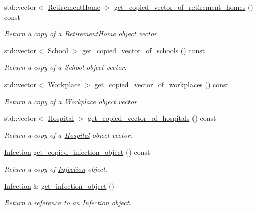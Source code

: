 \begin{DoxyCompactItemize}
std\+::vector$<$ \hyperlink{classRetirementHome}{Retirement\+Home} $>$ \hyperlink{classABM_abe2b2a6cef7427b941f6e5244e6737d4}{get\+\_\+copied\+\_\+vector\+\_\+of\+\_\+retirement\+\_\+homes} () const
\begin{DoxyCompactList}\small\item\em Return a copy of a \hyperlink{classRetirementHome}{Retirement\+Home} object vector. \end{DoxyCompactList}\item 
std\+::vector$<$ \hyperlink{classSchool}{School} $>$ \hyperlink{classABM_aa1c0bb9d97d823fb5c33b5d8ab2615b4}{get\+\_\+copied\+\_\+vector\+\_\+of\+\_\+schools} () const
\begin{DoxyCompactList}\small\item\em Return a copy of a \hyperlink{classSchool}{School} object vector. \end{DoxyCompactList}\item 
std\+::vector$<$ \hyperlink{classWorkplace}{Workplace} $>$ \hyperlink{classABM_a8e52715d31aebbd85ea022510a0b654a}{get\+\_\+copied\+\_\+vector\+\_\+of\+\_\+workplaces} () const
\begin{DoxyCompactList}\small\item\em Return a copy of a \hyperlink{classWorkplace}{Workplace} object vector. \end{DoxyCompactList}\item 
std\+::vector$<$ \hyperlink{classHospital}{Hospital} $>$ \hyperlink{classABM_ab07282ad3610001a8e7e3b1cd5929748}{get\+\_\+copied\+\_\+vector\+\_\+of\+\_\+hospitals} () const
\begin{DoxyCompactList}\small\item\em Return a copy of a \hyperlink{classHospital}{Hospital} object vector. \end{DoxyCompactList}\item 
\hyperlink{classInfection}{Infection} \hyperlink{classABM_af1ae91cc0294e370e6a686e80e6594f8}{get\+\_\+copied\+\_\+infection\+\_\+object} () const
\begin{DoxyCompactList}\small\item\em Return a copy of \hyperlink{classInfection}{Infection} object. \end{DoxyCompactList}\item 
\hyperlink{classInfection}{Infection} \& \hyperlink{classABM_a8857eef9de00abd42ce805befd03d3f0}{get\+\_\+infection\+\_\+object} ()
\begin{DoxyCompactList}\small\item\em Return a reference to an \hyperlink{classInfection}{Infection} object. \end{DoxyCompactList}\item 

\end{DoxyCompactItemize}
